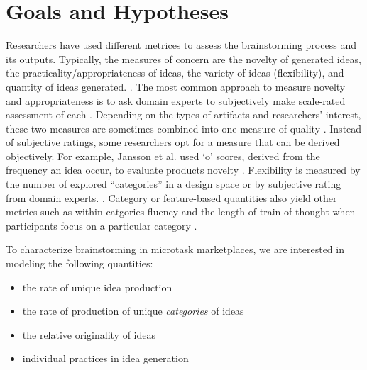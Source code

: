 \section{Goals and Hypotheses}

Researchers have used different metrices to assess the brainstorming process and its outputs. Typically, the measures of concern are the novelty of generated ideas, the practicality/appropriateness of ideas, the variety of ideas (flexibility), and quantity of ideas generated. \cite{finke1992creative, shah2003metrics}. The most common approach to measure novelty and appropriateness is to ask domain experts to subjectively make scale-rated assessment of each \cite{lewis2011affective, amabile_1983}. Depending on the types of artifacts and researchers' interest, these two measures are sometimes combined into one measure of quality \cite{little2010exploring}. Instead of subjective ratings, some researchers opt for a measure that can be derived objectively. For example, Jansson et al. used `o' scores, derived from the frequency an idea occur, to evaluate products novelty \cite{jansson_design_1991}. Flexibility is measured by the number of explored ``categories'' in a design space or by subjective rating from domain experts. \cite{lewis2011affective, marsh1996examples}. Category or feature-based quantities also yield other metrics such as within-catgories fluency and  the length of train-of-thought when participants focus on a particular category \cite{nijstad_how_2006}.


To characterize brainstorming in microtask marketplaces, we are interested in modeling the following quantities:
\begin{itemize}
\item the rate of unique idea production
\item the rate of production of unique \emph{categories} of ideas
\item the relative originality of ideas
\item individual practices in idea generation
\end{itemize}

